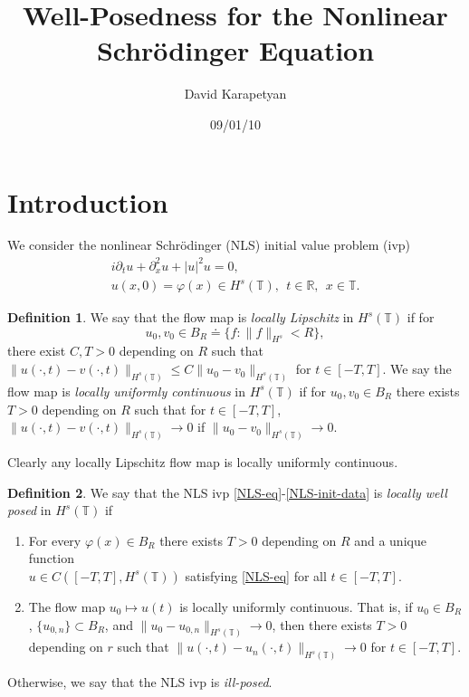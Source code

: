 \documentclass[12pt,reqno]{amsart}
\numberwithin{equation}{section}  %
\numberwithin{figure}{section}
\newcommand{\rr}{\mathbb{R}}
\newcommand{\ci}{\mathbb{T}}
\newcommand{\p}{\partial}
\newcommand{\vp}{\varphi}
\theoremstyle{plain}
\theoremstyle{definition}
\newtheorem{definition}{Definition}
\theoremstyle{remark}
\begin{document}
\title{Well-Posedness for the Nonlinear Schr\"{o}dinger Equation }
\author{David Karapetyan}
\address{Department of Mathematics  \\
         University  of Notre Dame\\
		          Notre Dame, IN 46556 }
				  \date{09/01/10}
				  \maketitle
				  \section{Introduction}
				  We consider the  nonlinear Schr\"{o}dinger (NLS) 
				  initial value problem (ivp)
%
%
\begin{gather}
	\label{NLS-eq}
	i \p_t u + \p_x^2 u +  |u|^2 u =0,
		\\
		\label{NLS-init-data}
		u(x,0) = \vp(x) \in H^s(\ci), \ \ t \in \rr, \ \ x \in \ci.
\end{gather}
%
%
\begin{definition}
	We say that the flow map is \emph{locally Lipschitz} in $H^s(\ci)$ if for
	$$u_0, v_0 \in B_R \doteq \{f: \|f\|_{H^s} < R\},$$ there exist $C, T>0$
	depending on $R$ such that $\|u(\cdot, t) - v(\cdot, t)
	\|_{H^s(\ci)} \le C \|u_{0} - v_0 \|_{H^s(\ci)}$ for $t \in [-T, T]$. We
	say the flow map is \emph{locally uniformly
	continuous} in $H^s(\ci)$ if for
	$u_0, v_0 \in B_R$ there exists $T >0$ depending on $R$ such that for
	$t \in [-T, T]$, $\|u(\cdot, t) - v(\cdot, t) \|_{H^s(\ci)} \to
	0$ if $\|u_0 - v_0 \|_{H^{s}(\ci)} \to 0$. 
\end{definition}
%
%
Clearly any locally Lipschitz flow map is locally uniformly continuous. 
\begin{definition}
	We say that the NLS ivp \eqref{NLS-eq}-\eqref{NLS-init-data} is
	\emph{locally well posed} in
	$H^s(\ci)$ if 
	\begin{enumerate}
		\item For every $\vp(x) \in
	B_R$ there exists $T>0$ depending on $R$ and a unique function
	\\
	$u \in C([-T, T],
	H^s(\ci))$ satisfying \eqref{NLS-eq} for all $t \in [-T, T]$. 
\item The flow map $u_0 \mapsto u(t)$ is locally uniformly continuous. That is, if $u_0
	\in B_R$, $\{u_{0,n}\} \subset B_R$, and 
	$\|u_0 - u_{0, n} \|_{H^{s}(\ci)} \to 0$, then there exists $T >0$ depending
	on $r$ such that $\|u(\cdot, t) - u_{n}(\cdot,t) \|_{H^s(\ci)} \to
	0$ for $t \in [-T, T]$. 
	\end{enumerate}
	Otherwise, we say that the NLS ivp is \emph{ill-posed}.
\end{definition}
\end{document}
